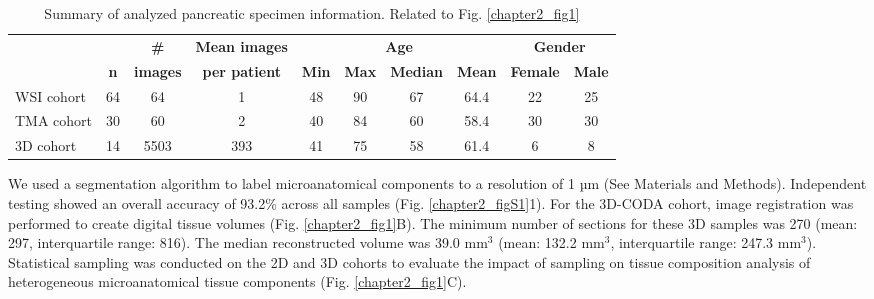 \begin{refsection}
    
    \begin{table}[htbp]
        \centering
        \scriptsize
        \renewcommand{\arraystretch}{1.2}
        \caption{Summary of analyzed pancreatic specimen information. Related to Fig. \ref{chapter2_fig1}}
        \label{table_S1}
        \begin{tabularx}{\textwidth}{l c c c c c c c c c}
            \toprule
            \textbf{} & \textbf{} &\textbf{\#}  & \textbf{Mean images} & \multicolumn{4}{c}{\textbf{Age}} & \multicolumn{2}{c}{\textbf{Gender}} \\
            \cmidrule(lr){5-8} \cmidrule(lr){9-10}
            \textbf{} & \textbf{n} & \textbf{images} & \textbf{per patient} & \textbf{Min} & \textbf{Max} & \textbf{Median} & \textbf{Mean} & \textbf{Female} & \textbf{Male} \\
            \midrule
            WSI cohort   & 64 & 64   & 1   & 48  & 90  & 67    & 64.4   & 22  & 25 \\
            TMA cohort   & 30 & 60   & 2   & 40  & 84  & 60    & 58.4   & 30  & 30 \\
            3D cohort    & 14 & 5503 & 393 & 41  & 75  & 58    & 61.4   & 6   & 8  \\
            \bottomrule
        \end{tabularx}
    \end{table}
    
    We used a segmentation algorithm to label microanatomical components to a resolution of 1 µm (See Materials and Methods). Independent testing showed an overall accuracy of 93.2\% across all samples (Fig. \ref{chapter2_figS1}1). For the 3D-CODA cohort, image registration was performed to create digital tissue volumes (Fig. \ref{chapter2_fig1}B). The minimum number of sections for these 3D samples was 270 (mean: 297, interquartile range: 816). The median reconstructed volume was 39.0 mm$^3$ (mean: 132.2 mm$^3$, interquartile range: 247.3 mm$^3$). Statistical sampling was conducted on the 2D and 3D cohorts to evaluate the impact of sampling on tissue composition analysis of heterogeneous microanatomical tissue components (Fig. \ref{chapter2_fig1}C).


\end{refsection}
